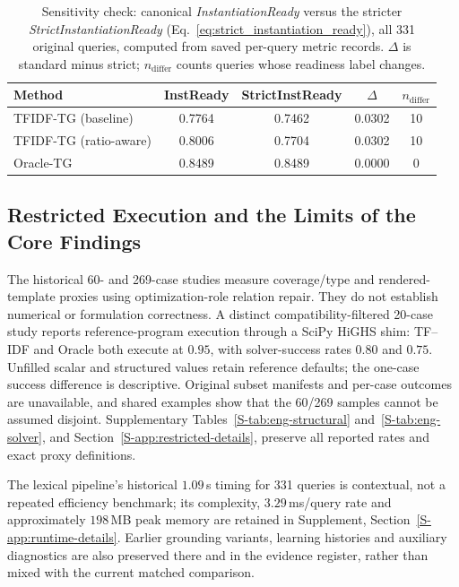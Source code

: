 \documentclass[pdflatex,sn-basic,Numbered]{sn-jnl}
\begin{document}
\begin{table}[t]
\centering
\caption{Sensitivity check: canonical \textit{InstantiationReady} versus the stricter \textit{StrictInstantiationReady} (Eq.~\eqref{eq:strict_instantiation_ready}), all 331 original queries, computed from saved per-query metric records. $\Delta$ is standard minus strict; $n_{\text{differ}}$ counts queries whose readiness label changes.}
\label{tab:strict-instready}
\small
\begin{tabular}{lcccc}
  \toprule
  Method & InstReady & StrictInstReady & $\Delta$ & $n_{\text{differ}}$ \\
  \midrule
TFIDF-TG (baseline) & 0.7764 & 0.7462 & 0.0302 & 10 \\
TFIDF-TG (ratio-aware) & 0.8006 & 0.7704 & 0.0302 & 10 \\
Oracle-TG & 0.8489 & 0.8489 & 0.0000 & 0 \\
  \bottomrule
\end{tabular}
\end{table}
\subsection{Restricted Execution and the Limits of the Core Findings}
\label{subsec:exp_engineering}
The historical 60- and 269-case studies measure coverage/type and rendered-template proxies using optimization-role relation repair. They do not establish numerical or formulation correctness. A distinct compatibility-filtered 20-case study reports reference-program execution through a SciPy HiGHS shim: TF--IDF and Oracle both execute at $0.95$, with solver-success rates $0.80$ and $0.75$. Unfilled scalar and structured values retain reference defaults; the one-case success difference is descriptive. Original subset manifests and per-case outcomes are unavailable, and shared examples show that the 60/269 samples cannot be assumed disjoint. Supplementary Tables~\ref{S-tab:eng-structural} and~\ref{S-tab:eng-solver}, and Section~\ref{S-app:restricted-details}, preserve all reported rates and exact proxy definitions.

\label{subsec:exp_runtime}
The lexical pipeline's historical $1.09$\,s timing for 331 queries is contextual, not a repeated efficiency benchmark; its complexity, $3.29$\,ms/query rate and approximately $198$\,MB peak memory are retained in Supplement, Section~\ref{S-app:runtime-details}. Earlier grounding variants, learning histories and auxiliary diagnostics are also preserved there and in the evidence register, rather than mixed with the current matched comparison.
\end{document}
